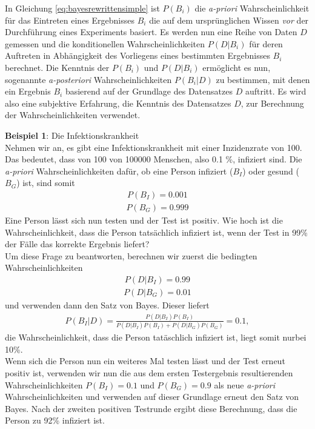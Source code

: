 In Gleichung \ref{eq:bayesrewrittensimple} ist $P(B_i)$ die \textit{a-priori} Wahrscheinlichkeit für das Eintreten eines Ergebnisses $B_i$ die auf dem ursprünglichen Wissen \textit{vor} der Durchführung eines Experiments basiert. Es werden nun eine Reihe von Daten $D$ gemessen und die konditionellen Wahrscheinlichkeiten $ P(D|B_i)$ für deren Auftreten in Abhängigkeit des Vorliegens eines bestimmten Ergebnisses $B_i$ berechnet. Die Kenntnis der $P(B_i)$ und $ P(D|B_i)$ ermöglicht es nun, sogenannte \textit{a-posteriori} Wahrscheinlichkeiten $ P(B_i|D)$ zu bestimmen, mit denen ein Ergebnis $B_i$ basierend auf der Grundlage des Datensatzes $D$ auftritt. Es wird also eine subjektive Erfahrung, die Kenntnis des Datensatzes $D$, zur Berechnung der Wahrscheinlichkeiten verwendet.


\begin{center}
\begin{tcolorbox}[enhanced,width=6in,drop fuzzy shadow southwest,
colframe=blue!50!black,colback=blue!01]
\textbf{Beispiel 1}: Die Infektionskrankheit \\
 Nehmen wir an, es gibt eine Infektionskrankheit mit einer Inzidenzrate von 100. Das bedeutet, dass von 100 von 100000 Menschen, also 0.1 \%, infiziert sind.  Die \textit{a-priori} Wahrscheinlichkeiten dafür, ob eine Person infiziert ($B_I$) oder gesund ($B_G$) ist, sind somit
 \begin{align}
 P(B_I) = 0.001 \label{eq:proability-example}
 \end{align}
  \begin{align}
 P(B_G) = 0.999 \label{eq:proability-example2}
 \end{align}
 Eine Person lässt sich nun testen und der Test ist positiv. Wie hoch ist die Wahrscheinlichkeit, dass die Person tatsächlich infiziert ist, wenn der Test in 99\% der Fälle das korrekte Ergebnis liefert?  \\

 Um diese Frage zu beantworten, berechnen wir zuerst die bedingten Wahrscheinlichkeiten
 \begin{align}
P(D|B_I) = 0.99
 \end{align}
  \begin{align}
P(D|B_G) = 0.01
 \end{align}
und verwenden dann den Satz von Bayes. Dieser liefert
\begin{align}
P(B_I|D) = \frac{P(D|B_I)P(B_I)}{P(D|B_I)P(B_I) + P(D|B_G)P(B_G)} = 0.1,
\end{align}
die Wahrscheinlichkeit, dass die Person tatäschlich infiziert ist, liegt somit \glqq nur\grqq  bei 10\%. \\

Wenn sich die Person nun ein weiteres Mal testen lässt und der Test erneut positiv ist, verwenden wir nun die aus dem ersten Testergebnis resultierenden Wahrscheinlichkeiten $P(B_I) = 0.1$ und $P(B_G) = 0.9$ als neue \textit{a-priori} Wahrscheinlichkeiten und verwenden auf dieser Grundlage erneut den Satz von Bayes. Nach der zweiten positiven Testrunde ergibt diese Berechnung, dass die Person zu 92\% infiziert ist. 
\end{tcolorbox}
\end{center}


